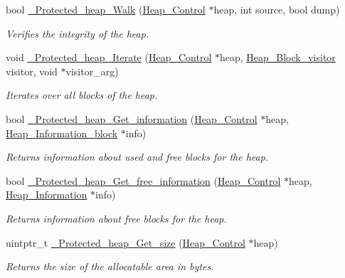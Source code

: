 \begin{DoxyCompactItemize}
bool \mbox{\hyperlink{group__RTEMSScoreProtHeap_ga87a4c8acb0a309a5c9a22a93f105cf2e}{\+\_\+\+Protected\+\_\+heap\+\_\+\+Walk}} (\mbox{\hyperlink{structHeap__Control}{Heap\+\_\+\+Control}} $\ast$heap, int source, bool dump)
\begin{DoxyCompactList}\small\item\em Verifies the integrity of the heap. \end{DoxyCompactList}\item 
void \mbox{\hyperlink{group__RTEMSScoreProtHeap_ga8bdc01fbd6baf99d53c193ebd965b7ad}{\+\_\+\+Protected\+\_\+heap\+\_\+\+Iterate}} (\mbox{\hyperlink{structHeap__Control}{Heap\+\_\+\+Control}} $\ast$heap, \mbox{\hyperlink{group__RTEMSScoreHeap_gab5fc026bfabc31c620545e574d579b64}{Heap\+\_\+\+Block\+\_\+visitor}} visitor, void $\ast$visitor\+\_\+arg)
\begin{DoxyCompactList}\small\item\em Iterates over all blocks of the heap. \end{DoxyCompactList}\item 
bool \mbox{\hyperlink{group__RTEMSScoreProtHeap_ga327ad8c35910aeef2bad64e4ba05bbbf}{\+\_\+\+Protected\+\_\+heap\+\_\+\+Get\+\_\+information}} (\mbox{\hyperlink{structHeap__Control}{Heap\+\_\+\+Control}} $\ast$heap, \mbox{\hyperlink{structHeap__Information__block}{Heap\+\_\+\+Information\+\_\+block}} $\ast$info)
\begin{DoxyCompactList}\small\item\em Returns information about used and free blocks for the heap. \end{DoxyCompactList}\item 
bool \mbox{\hyperlink{group__RTEMSScoreProtHeap_ga54aae0cfc83e761f71d9219228f614d4}{\+\_\+\+Protected\+\_\+heap\+\_\+\+Get\+\_\+free\+\_\+information}} (\mbox{\hyperlink{structHeap__Control}{Heap\+\_\+\+Control}} $\ast$heap, \mbox{\hyperlink{structHeap__Information}{Heap\+\_\+\+Information}} $\ast$info)
\begin{DoxyCompactList}\small\item\em Returns information about free blocks for the heap. \end{DoxyCompactList}\item 
uintptr\+\_\+t \mbox{\hyperlink{group__RTEMSScoreProtHeap_ga1f617743f0fc81830ede1e14e194ffc7}{\+\_\+\+Protected\+\_\+heap\+\_\+\+Get\+\_\+size}} (\mbox{\hyperlink{structHeap__Control}{Heap\+\_\+\+Control}} $\ast$heap)
\begin{DoxyCompactList}\small\item\em Returns the size of the allocatable area in bytes. \end{DoxyCompactList}\end{DoxyCompactItemize}


